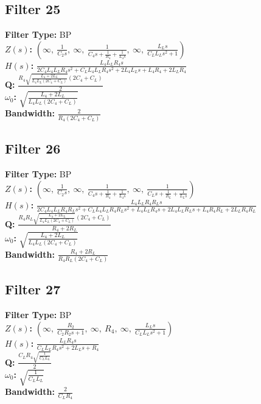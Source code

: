 \documentclass{article}
\begin{document}
\subsection*{Filter 25}
\textbf{Filter Type:} BP \\ 
\textbf{$Z(s)$:} $\left( \infty, \  \frac{1}{C_{2} s}, \  \infty, \  \frac{1}{C_{4} s + \frac{1}{R_{4}} + \frac{1}{L_{4} s}}, \  \infty, \  \frac{L_{L} s}{C_{L} L_{L} s^{2} + 1}\right)$ \\ 
\textbf{$H(s)$:} $\frac{L_{4} L_{L} R_{4} s}{2 C_{4} L_{4} L_{L} R_{4} s^{2} + C_{L} L_{4} L_{L} R_{4} s^{2} + 2 L_{4} L_{L} s + L_{4} R_{4} + 2 L_{L} R_{4}}$ \\ 
\textbf{Q:} $\frac{R_{4} \sqrt{\frac{L_{4} + 2 L_{L}}{L_{4} L_{L} \left(2 C_{4} + C_{L}\right)}} \left(2 C_{4} + C_{L}\right)}{2}$ \\ 
\textbf{$\omega_0$:} $\sqrt{\frac{L_{4} + 2 L_{L}}{L_{4} L_{L} \left(2 C_{4} + C_{L}\right)}}$ \\ 
\textbf{Bandwidth:} $\frac{2}{R_{4} \left(2 C_{4} + C_{L}\right)}$ \\ 
\subsection*{Filter 26}
\textbf{Filter Type:} BP \\ 
\textbf{$Z(s)$:} $\left( \infty, \  \frac{1}{C_{2} s}, \  \infty, \  \frac{1}{C_{4} s + \frac{1}{R_{4}} + \frac{1}{L_{4} s}}, \  \infty, \  \frac{1}{C_{L} s + \frac{1}{R_{L}} + \frac{1}{L_{L} s}}\right)$ \\ 
\textbf{$H(s)$:} $\frac{L_{4} L_{L} R_{4} R_{L} s}{2 C_{4} L_{4} L_{L} R_{4} R_{L} s^{2} + C_{L} L_{4} L_{L} R_{4} R_{L} s^{2} + L_{4} L_{L} R_{4} s + 2 L_{4} L_{L} R_{L} s + L_{4} R_{4} R_{L} + 2 L_{L} R_{4} R_{L}}$ \\ 
\textbf{Q:} $\frac{R_{4} R_{L} \sqrt{\frac{L_{4} + 2 L_{L}}{L_{4} L_{L} \left(2 C_{4} + C_{L}\right)}} \left(2 C_{4} + C_{L}\right)}{R_{4} + 2 R_{L}}$ \\ 
\textbf{$\omega_0$:} $\sqrt{\frac{L_{4} + 2 L_{L}}{L_{4} L_{L} \left(2 C_{4} + C_{L}\right)}}$ \\ 
\textbf{Bandwidth:} $\frac{R_{4} + 2 R_{L}}{R_{4} R_{L} \left(2 C_{4} + C_{L}\right)}$ \\ 
\subsection*{Filter 27}
\textbf{Filter Type:} BP \\ 
\textbf{$Z(s)$:} $\left( \infty, \  \frac{R_{2}}{C_{2} R_{2} s + 1}, \  \infty, \  R_{4}, \  \infty, \  \frac{L_{L} s}{C_{L} L_{L} s^{2} + 1}\right)$ \\ 
\textbf{$H(s)$:} $\frac{L_{L} R_{4} s}{C_{L} L_{L} R_{4} s^{2} + 2 L_{L} s + R_{4}}$ \\ 
\textbf{Q:} $\frac{C_{L} R_{4} \sqrt{\frac{1}{C_{L} L_{L}}}}{2}$ \\ 
\textbf{$\omega_0$:} $\sqrt{\frac{1}{C_{L} L_{L}}}$ \\ 
\textbf{Bandwidth:} $\frac{2}{C_{L} R_{4}}$ \\ 
\end{document}

